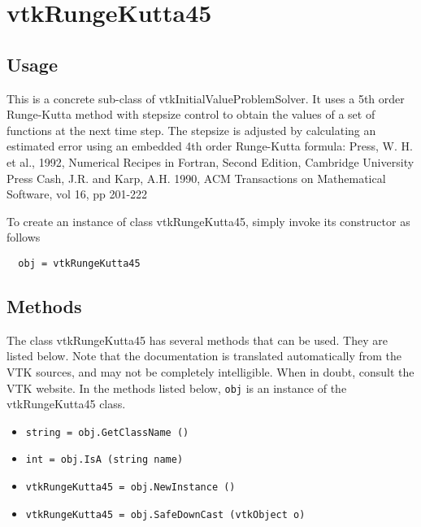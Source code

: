 \section{vtkRungeKutta45}

\subsection{Usage}

 This is a concrete sub-class of vtkInitialValueProblemSolver.
 It uses a 5th order Runge-Kutta method with stepsize control to obtain 
 the values of a set of functions at the next time step. The stepsize
 is adjusted by calculating an estimated error using an embedded 4th
 order Runge-Kutta formula:
 Press, W. H. et al., 1992, Numerical Recipes in Fortran, Second
 Edition, Cambridge University Press
 Cash, J.R. and Karp, A.H. 1990, ACM Transactions on Mathematical
 Software, vol 16, pp 201-222

To create an instance of class vtkRungeKutta45, simply
invoke its constructor as follows
\begin{verbatim}
  obj = vtkRungeKutta45
\end{verbatim}
\subsection{Methods}

The class vtkRungeKutta45 has several methods that can be used.
  They are listed below.
Note that the documentation is translated automatically from the VTK sources,
and may not be completely intelligible.  When in doubt, consult the VTK website.
In the methods listed below, \verb|obj| is an instance of the vtkRungeKutta45 class.
\begin{itemize}
\item  \verb|string = obj.GetClassName ()|

\item  \verb|int = obj.IsA (string name)|

\item  \verb|vtkRungeKutta45 = obj.NewInstance ()|

\item  \verb|vtkRungeKutta45 = obj.SafeDownCast (vtkObject o)|

\end{itemize}
